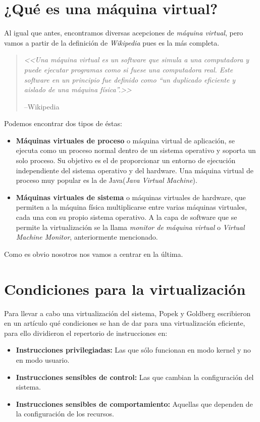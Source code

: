\section{¿Qué es una máquina virtual?}

\noindent Al igual que antes, encontramos diversas acepciones de \emph{máquina virtual}, pero vamos a partir de la definición de \emph{Wikipedia} pues es la más completa.

\begin{quote}
\emph{<<Una máquina virtual es un software que simula a una computadora y puede ejecutar programas como si fuese una computadora real. Este software en un principio fue definido como \textquotedblleft un duplicado eficiente y aislado de una máquina física\textquotedblright.>>}
\begin{flushright}
--Wikipedia\cite{defmaqvirwiki}
\end{flushright}
\end{quote}

\noindent Podemos encontrar dos tipos de éstas:

\begin{itemize}
\item \textbf{Máquinas virtuales de proceso} o máquina virtual de aplicación, se ejecuta como un proceso normal dentro de un sistema operativo y soporta un solo proceso. Su objetivo es el de proporcionar un entorno de ejecución independiente del sistema operativo y del hardware. Una máquina virtual de proceso muy popular es la de Java(\emph{Java Virtual Machine}).
\item \textbf{Máquinas virtuales de sistema} o máquinas virtuales de hardware, que permiten a la máquina física multiplicarse entre varias máquinas virtuales, cada una con su propio sistema operativo. A la capa de software que se permite la virtualización se la llama \emph{monitor de máquina virtual} o \emph{Virtual Machine Monitor}, anteriormente mencionado.
\end{itemize}

\noindent Como es obvio nosotros nos vamos a centrar en la última.

\section{Condiciones para la virtualización}

\noindent Para llevar a cabo una virtualización del sistema, Popek y Goldberg escribieron en un artículo\cite{reqvir} qué condiciones se han de dar para una virtualización eficiente, para ello dividieron el repertorio de instrucciones en:
\begin{itemize}
\item \textbf{Instrucciones privilegiadas:} Las que sólo funcionan en modo kernel y no en modo usuario.
\item \textbf{Instrucciones sensibles de control:} Las que cambian la configuración del sistema.
\item \textbf{Instrucciones sensibles de comportamiento:} Aquellas que dependen de la configuración de los recursos. 
\end{itemize}

